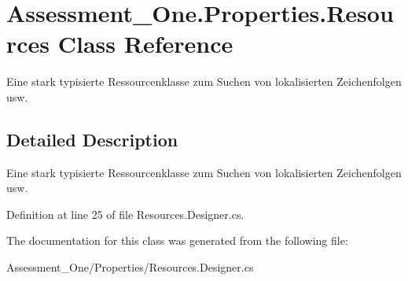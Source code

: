 \hypertarget{class_assessment___one_1_1_properties_1_1_resources}{
\section{Assessment\_\-One.Properties.Resources Class Reference}
\label{class_assessment___one_1_1_properties_1_1_resources}
}


Eine stark typisierte Ressourcenklasse zum Suchen von lokalisierten Zeichenfolgen usw.  




\subsection{Detailed Description}
Eine stark typisierte Ressourcenklasse zum Suchen von lokalisierten Zeichenfolgen usw. 

Definition at line 25 of file Resources.Designer.cs.



The documentation for this class was generated from the following file:\begin{DoxyCompactItemize}
\item 
Assessment\_\-One/Properties/Resources.Designer.cs\end{DoxyCompactItemize}

